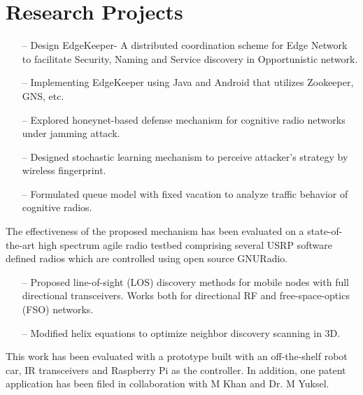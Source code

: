 \documentclass[11pt,letterpaper,sans]{moderncv}   %
\begin{document}
\section{Research Projects}
{
	\begin{itemize}
		\item[--]Design EdgeKeeper- A distributed coordination scheme for Edge Network to facilitate Security, Naming and Service discovery in Opportunistic network.
		\item[--] Implementing EdgeKeeper using Java and Android that utilizes Zookeeper, GNS, etc.
	\end{itemize}
}


  {
  \begin{itemize}
    \item[--] Explored honeynet-based defense mechanism for cognitive radio networks under jamming attack.
    \item[--] Designed stochastic learning mechanism to perceive attacker's strategy by wireless fingerprint. 
    \item[--] Formulated queue model with fixed vacation to analyze traffic behavior of cognitive radios.
  \end{itemize}
  The effectiveness of the proposed mechanism has been evaluated on a state-of-the-art high spectrum agile radio testbed comprising several USRP software defined radios which are controlled using open source GNURadio.
  }

  {
  \begin{itemize}
    \item[--] Proposed line-of-sight (LOS) discovery methods for mobile nodes with full directional transceivers. Works both for directional RF and free-space-optics (FSO) networks.
    \item[--] Modified helix equations to optimize neighbor discovery scanning in 3D. 
  \end{itemize}
  This work has been evaluated with a prototype built with an off-the-shelf robot car, IR transceivers and Raspberry Pi as the controller. In addition, one patent application has been filed in collaboration with M Khan and Dr. M Yuksel.
  }
\end{document}
